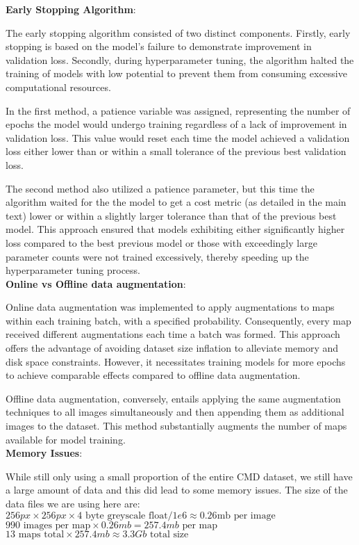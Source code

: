 \documentclass[11pt]{scrartcl}
\begin{document}
\noindent \textbf{Early Stopping Algorithm}:

The early stopping algorithm consisted of two distinct components. Firstly, early stopping is based on the model's failure to demonstrate improvement in validation loss. Secondly, during hyperparameter tuning, the algorithm halted the training of models with low potential to prevent them from consuming excessive computational resources. 

In the first method, a patience variable was assigned, representing the number of epochs the model would undergo training regardless of a lack of improvement in validation loss. This value would reset each time the model achieved a validation loss either lower than or within a small tolerance of the previous best validation loss.

The second method also utilized a patience parameter, but this time the algorithm waited for the the model to get a cost metric (as detailed in the main text) lower or within a slightly larger tolerance than that of the previous best model. This approach ensured that models exhibiting either significantly higher loss compared to the best previous model or those with exceedingly large parameter counts were not trained excessively, thereby speeding up the hyperparameter tuning process.\\

\noindent \textbf{Online vs Offline data augmentation}: 

Online data augmentation was implemented to apply augmentations to maps within each training batch, with a specified probability. Consequently, every map received different augmentations each time a batch was formed. This approach offers the advantage of avoiding dataset size inflation to alleviate memory and disk space constraints. However, it necessitates training models for more epochs to achieve comparable effects compared to offline data augmentation.

Offline data augmentation, conversely, entails applying the same augmentation techniques to all images simultaneously and then appending them as additional images to the dataset. This method substantially augments the number of maps available for model training.\\

\noindent \textbf{Memory Issues}:

While still only using a small proportion of the entire CMD dataset, we still have a large amount of data and this did lead to some memory issues.
The size of the data files we are using here are: \\
$256px \times 256px \times 4 \textrm{ byte greyscale float} / 1e6 \approx 0.26 \textrm{mb per image}$ \\
$990 \textrm{ images per map} \times 0.26mb = 257.4mb \textrm { per map}$\\
$ 13 \textrm{ maps total} \times 257.4mb \approx 3.3Gb \textrm{ total size}$\\
\end{document}
